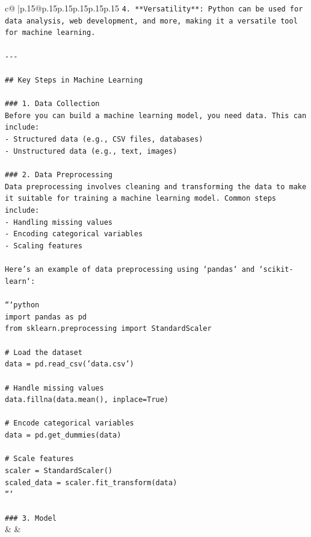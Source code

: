 \documentclass{article}
\begin{document}
{\begin{supertabular}{c@{$\;$}|p{.15\linewidth}@{}p{.15\linewidth}p{.15\linewidth}p{.15\linewidth}p{.15\linewidth}p{.15\linewidth}}
{{{\texttt{4. **Versatility**: Python can be used for data analysis, web development, and more, making it a versatile tool for machine learning.} \\
\\ 
\texttt{{-}{-}{-}} \\
\\ 
\texttt{\#\# Key Steps in Machine Learning} \\
\\ 
\texttt{\#\#\# 1. Data Collection} \\
\texttt{Before you can build a machine learning model, you need data. This can include:} \\
\texttt{{-} Structured data (e.g., CSV files, databases)} \\
\texttt{{-} Unstructured data (e.g., text, images)} \\
\\ 
\texttt{\#\#\# 2. Data Preprocessing} \\
\texttt{Data preprocessing involves cleaning and transforming the data to make it suitable for training a machine learning model. Common steps include:} \\
\texttt{{-} Handling missing values} \\
\texttt{{-} Encoding categorical variables} \\
\texttt{{-} Scaling features} \\
\\ 
\texttt{Here’s an example of data preprocessing using `pandas` and `scikit{-}learn`:} \\
\\ 
\texttt{```python} \\
\texttt{import pandas as pd} \\
\texttt{from sklearn.preprocessing import StandardScaler} \\
\\ 
\texttt{\# Load the dataset} \\
\texttt{data = pd.read\_csv('data.csv')} \\
\\ 
\texttt{\# Handle missing values} \\
\texttt{data.fillna(data.mean(), inplace=True)} \\
\\ 
\texttt{\# Encode categorical variables} \\
\texttt{data = pd.get\_dummies(data)} \\
\\ 
\texttt{\# Scale features} \\
\texttt{scaler = StandardScaler()} \\
\texttt{scaled\_data = scaler.fit\_transform(data)} \\
\texttt{```} \\
\\ 
\texttt{\#\#\# 3. Model} \\
            }
        }
    }
    & & \\ \\


\end{supertabular}}
\end{document}
